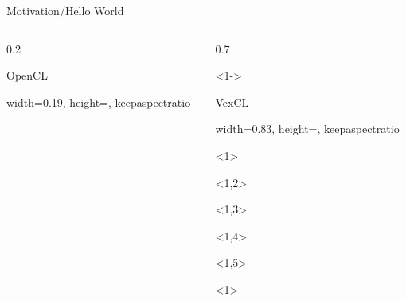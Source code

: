 \documentclass[@BEAMER_OPTIONS@]{beamer}
\begin{document}
\begin{frame}[fragile]{Motivation/Hello World}
\begin{columns}
\begin{column}[t]{0.2\textwidth}
\begin{exampleblock}{OpenCL}
\begin{adjustbox}{width=0.19\textwidth, height=\textheight, keepaspectratio}
\begin{minipage}{\textwidth}
\begin{uncoverenv}
                            
                        \end{uncoverenv}
                    \end{minipage}
                \end{adjustbox}
            \end{exampleblock}
        \end{column}
        \begin{column}[t]{0.7\textwidth}
            \begin{onlyenv}<1->
            \begin{exampleblock}{VexCL}
                \begin{adjustbox}{width=0.83\textwidth, height=\textheight, keepaspectratio}
                    \begin{minipage}{\textwidth}
                        \begin{uncoverenv}<1>
                            
                        \end{uncoverenv}
                        \begin{uncoverenv}<1,2>
                            
                        \end{uncoverenv}
                        \begin{uncoverenv}<1,3>
                            
                        \end{uncoverenv}
                        \begin{uncoverenv}<1,4>
                            
                        \end{uncoverenv}
                        \begin{uncoverenv}<1,5>
                            
                        \end{uncoverenv}
                        \begin{uncoverenv}<1>
                            
                        \end{uncoverenv}
                    \end{minipage}
                \end{adjustbox}
            \end{exampleblock}
            \end{onlyenv}
        \end{column}
    \end{columns}
\end{frame}
\end{document}
